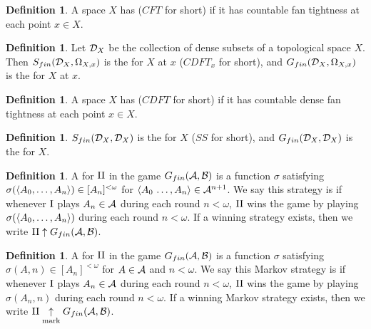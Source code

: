 \documentclass[11pt]{article}
\theoremstyle{plain}
\theoremstyle{definition}
\newtheorem{definition}[theorem]{Definition}
\theoremstyle{remark}
\theoremstyle{plain}
\theoremstyle{definition}
\theoremstyle{remark}
\begin{document}
\begin{definition}
  A space \(X\) has  (\(CFT\) for short)
  if it has
  countable fan tightness at each point \(x\in X\).
\end{definition}

\begin{definition}
  Let \(\mathcal{D}_{X}\) be the collection of dense subsets of a topological
  space \(X\).
  Then \(S_{fin}(\mathcal{D}_X,\Omega_{X,x})\) is the
   for \(X\) at \(x\)
  (\(CDFT_x\) for short), and
  \(G_{fin}(\mathcal{D}_X,\Omega_{X,x})\) is the
   for \(X\) at \(x\).
\end{definition}

\begin{definition}
  A space \(X\) has 
  (\(CDFT\) for short) if it has
  countable dense fan tightness at each point \(x\in X\).
\end{definition}

\begin{definition}
  \(S_{fin}(\mathcal{D}_X,\mathcal{D}_X)\) is the
   for \(X\)
  (\(SS\) for short), and
  \(G_{fin}(\mathcal{D}_X,\mathcal{D}_X)\) is the
   for \(X\).
\end{definition}

\begin{definition}
  A  for \(\mathrm{II}\) in the game \(G_{fin}(\mathcal{A},\mathcal{B})\)
  is a function \(\sigma\) satisfying
  \(\sigma(\langle A_0,\dots,A_n\rangle)\in[A_n]^{<\omega}\) for
  \(\langle A_0\,\dots,A_n\rangle\in\mathcal{A}^{n+1}\). We say this strategy is
   if whenever \(\mathrm{I}\) plays \(A_n\in\mathcal{A}\) during each
  round \(n<\omega\), \(\mathrm{II}\) wins the game by playing
  \(\sigma(\langle A_0,\dots,A_n\rangle)\) during each round \(n<\omega\).
  If a winning strategy exists, then we write
  \(\mathrm{II}\uparrow G_{fin}(\mathcal{A},\mathcal{B})\).
\end{definition}

\begin{definition}
  A  for \(\mathrm{II}\) in the game
  \(G_{fin}(\mathcal{A},\mathcal{B})\)
  is a function \(\sigma\) satisfying
  \(\sigma(A,n)\in[A_n]^{<\omega}\) for
  \(A\in\mathcal{A}\) and \(n<\omega\). We say this Markov strategy is
   if whenever \(\mathrm{I}\) plays \(A_n\in\mathcal{A}\) during each
  round \(n<\omega\), \(\mathrm{II}\) wins the game by playing
  \(\sigma(A_n,n)\) during each round \(n<\omega\).
  If a winning Markov strategy exists, then we write
  \(\mathrm{II}\underset{\text{mark}}{\uparrow}G_{fin}(\mathcal{A},\mathcal{B})\).
\end{definition}
\end{document}
